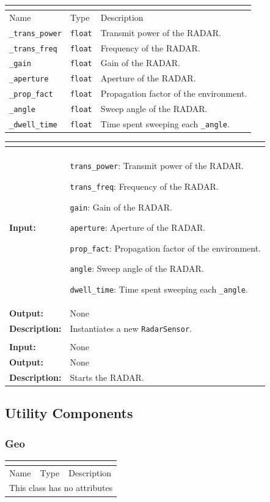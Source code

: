 \documentclass[titlepage]{article}
\renewenvironment{itemize*}
    {\begin{itemize}
        \setlength{\itemsep}{0pt}%
        \setlength{\parskip}{0pt}%
        \setlength{\partopsep}{0pt}%
        \setlength{\topsep}{0pt}}%
    {\end{itemize}}
\newcommand{\operations}[1]{
\begin{center}
    \begin{longtable}{|p{4cm}|p{10cm + 2.0\tabcolsep}|}
    \hline
    \multicolumn{2}{|l|}{\cellcolor[gray]{0.5}{\textbf{Operations}}} \\ \hline
#1
    \end{longtable}
\end{center}
}
\newcommand{\operation}[4]{
    \hline
    \multicolumn{2}{|l|}{\cellcolor[gray]{0.8}{\texttt{#1}}} \\ \hline
    \hspace{7pt}\textbf{Input:} & #2 \\ \hline
    \hspace{7pt}\textbf{Output:} & #3 \\ \hline
    \hspace{7pt}\textbf{Description:} & #4 \\ \hline
}
\newcommand{\noattributes}{
    \begin{center}
        \begin{tabular}{|p{3cm}|p{3cm}|p{8cm}|}
            \multicolumn{3}{|l|}{\cellcolor[gray]{0.5}{\textbf{Attributes}}} \\ \hline
            \rowcolor[gray]{0.8} Name & Type & Description \\ \hline 
            \multicolumn{3}{|c|}{This class has no attributes} \\ \hline
        \end{tabular}
    \end{center}
}
\newcommand{\attributes}[1]{
    \begin{center}
        \begin{tabular}{|p{3.5cm}|p{3.5cm}|p{7cm}|}
            \multicolumn{3}{|l|}{\cellcolor[gray]{0.5}{\textbf{Attributes}}} \\ \hline
            \rowcolor[gray]{0.8} Name & Type & Description \\ \hline 
            #1
        \end{tabular}
    \end{center}
}
\newcommand{\attribute}[3]{
    \texttt{#1} & \texttt{#2} & #3 \\ \hline
}
\begin{document}
\attributes
{
    \attribute{\_trans\_power}{float}{Transmit power of the RADAR.}
    \attribute{\_trans\_freq}{float}{Frequency of the RADAR.}
    \attribute{\_gain}{float}{Gain of the RADAR.}
    \attribute{\_aperture}{float}{Aperture of the RADAR.}
    \attribute{\_prop\_fact}{float}{Propagation factor of the environment.}
    \attribute{\_angle}{float}{Sweep angle of the RADAR.}
    \attribute{\_dwell\_time}{float}{Time spent sweeping each \texttt{\_angle}.}
}

\operations
{
    \operation{\_\_init\_\_(trans\_power, trans\_freq, gain, aperture, prop\_fact, dwell\_time, angle)}{
        \begin{itemize*}
            \item \texttt{trans\_power}: Transmit power of the RADAR.
            \item \texttt{trans\_freq}: Frequency of the RADAR.
            \item \texttt{gain}: Gain of the RADAR.
            \item \texttt{aperture}: Aperture of the RADAR.
            \item \texttt{prop\_fact}: Propagation factor of the environment.
            \item \texttt{angle}: Sweep angle of the RADAR.
            \item \texttt{dwell\_time}: Time spent sweeping each \texttt{\_angle}.
        \end{itemize*}}{None}{Instantiates a new \texttt{RadarSensor}.}
    \operation{run()}{None}{None}{Starts the RADAR.}
}

\subsection{Utility Components}
\subsubsection{Geo}

\noattributes
\end{document}
